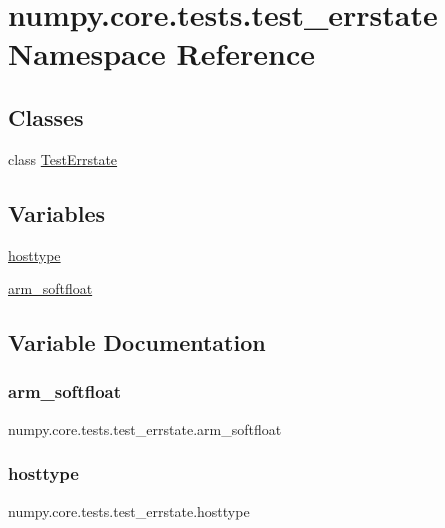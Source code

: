\hypertarget{namespacenumpy_1_1core_1_1tests_1_1test__errstate}{}\section{numpy.\+core.\+tests.\+test\+\_\+errstate Namespace Reference}
\label{namespacenumpy_1_1core_1_1tests_1_1test__errstate}
\subsection*{Classes}
\begin{DoxyCompactItemize}
\item 
class \hyperlink{classnumpy_1_1core_1_1tests_1_1test__errstate_1_1TestErrstate}{Test\+Errstate}
\end{DoxyCompactItemize}
\subsection*{Variables}
\begin{DoxyCompactItemize}
\item 
\hyperlink{namespacenumpy_1_1core_1_1tests_1_1test__errstate_ad1bdf69fbf559c6095620af00431223a}{hosttype}
\item 
\hyperlink{namespacenumpy_1_1core_1_1tests_1_1test__errstate_a8b660dd08b3227b1ee5461a3696eb007}{arm\+\_\+softfloat}
\end{DoxyCompactItemize}


\subsection{Variable Documentation}
\mbox{\label{namespacenumpy_1_1core_1_1tests_1_1test__errstate_a8b660dd08b3227b1ee5461a3696eb007}} 
\subsubsection{\texorpdfstring{arm\+\_\+softfloat}{arm\_softfloat}}
{\footnotesize\ttfamily numpy.\+core.\+tests.\+test\+\_\+errstate.\+arm\+\_\+softfloat}

\mbox{\label{namespacenumpy_1_1core_1_1tests_1_1test__errstate_ad1bdf69fbf559c6095620af00431223a}} 
\subsubsection{\texorpdfstring{hosttype}{hosttype}}
{\footnotesize\ttfamily numpy.\+core.\+tests.\+test\+\_\+errstate.\+hosttype}

